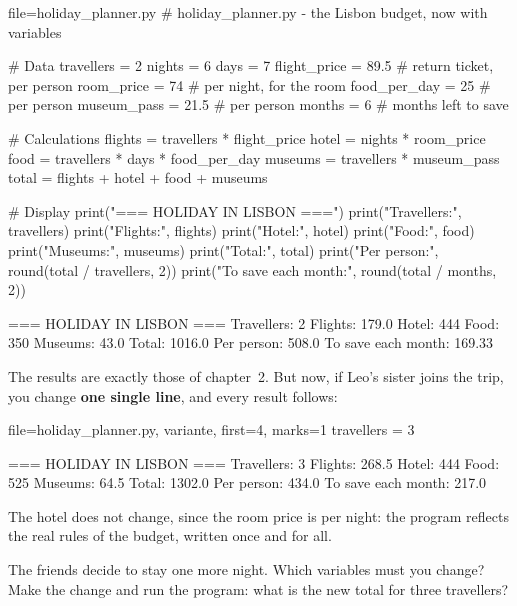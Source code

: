\begin{code}{file=holiday_planner.py}
# holiday_planner.py - the Lisbon budget, now with variables

# Data
travellers = 2
nights = 6
days = 7
flight_price = 89.5      # return ticket, per person
room_price = 74          # per night, for the room
food_per_day = 25        # per person
museum_pass = 21.5       # per person
months = 6               # months left to save

# Calculations
flights = travellers * flight_price
hotel = nights * room_price
food = travellers * days * food_per_day
museums = travellers * museum_pass
total = flights + hotel + food + museums

# Display
print("=== HOLIDAY IN LISBON ===")
print("Travellers:", travellers)
print("Flights:", flights)
print("Hotel:", hotel)
print("Food:", food)
print("Museums:", museums)
print("Total:", total)
print("Per person:", round(total / travellers, 2))
print("To save each month:", round(total / months, 2))
\end{code}
\begin{sortie}
=== HOLIDAY IN LISBON ===
Travellers: 2
Flights: 179.0
Hotel: 444
Food: 350
Museums: 43.0
Total: 1016.0
Per person: 508.0
To save each month: 169.33
\end{sortie}

The results are exactly those of chapter~2. But now, if Leo's sister joins the trip, you change
\textbf{one single line}, and every result follows:

\begin{code}{file=holiday_planner.py, variante, first=4, marks={1}}
travellers = 3
\end{code}
\begin{sortie}
=== HOLIDAY IN LISBON ===
Travellers: 3
Flights: 268.5
Hotel: 444
Food: 525
Museums: 64.5
Total: 1302.0
Per person: 434.0
To save each month: 217.0
\end{sortie}

The hotel does not change, since the room price is per night: the program reflects the real rules
of the budget, written once and for all.

\begin{atoi}
The friends decide to stay one more night. Which variables must you change? Make the change and run
the program: what is the new total for three travellers?
\end{atoi}


